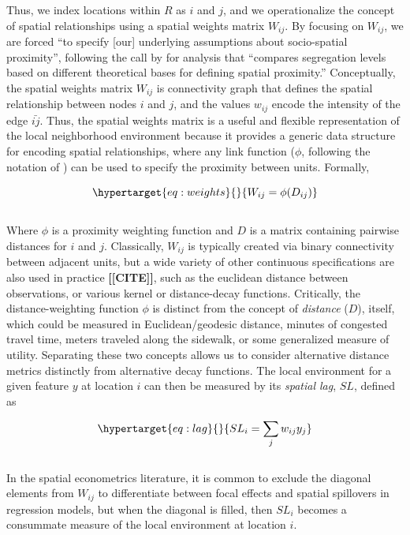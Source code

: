 \documentclass[
  10pt,
]{article}
\begin{document}
Thus, we index locations within \(R\) as \(i\) and \(j\), and we
operationalize the concept of spatial relationships using a spatial
weights matrix \(W_{ij}\). By focusing on \(W_{ij}\), we are forced ``to
specify {[}our{]} underlying assumptions about socio-spatial
proximity'', following the call by
\citet[p.154]{reardon2004MeasuresSpatial} for analysis that ``compares
segregation levels based on different theoretical bases for defining
spatial proximity.'' Conceptually, the spatial weights matrix \(W_{ij}\)
is connectivity graph that defines the spatial relationship between
nodes \(i\) and \(j\), and the values \(w_{ij}\) encode the intensity of
the edge \(\bar{ij}\). Thus, the spatial weights matrix is a useful and
flexible representation of the local neighborhood environment because it
provides a generic data structure for encoding spatial relationships,
where any link function (\(\phi\), following the notation of
\citet{reardon2004MeasuresSpatial}) can be used to specify the proximity
between units. Formally,

\begin{equation}\protect\hypertarget{eq:weights}{}{ W_{ij} = \phi(D_{ij}) }\label{eq:weights}\end{equation}\\
Where \(\phi\) is a proximity weighting function and \(D\) is a matrix
containing pairwise distances for \(i\) and \(j\). Classically,
\(W_{ij}\) is typically created via binary connectivity between adjacent
units, but a wide variety of other continuous specifications are also
used in practice \textbf{{[}{[}CITE{]}{]}}, such as the euclidean
distance between observations, or various kernel or distance-decay
functions. Critically, the distance-weighting function \(\phi\) is
distinct from the concept of \emph{distance} (\(D\)), itself, which
could be measured in Euclidean/geodesic distance, minutes of congested
travel time, meters traveled along the sidewalk, or some generalized
measure of utility. Separating these two concepts allows us to consider
alternative distance metrics distinctly from alternative decay
functions. The local environment for a given feature \(y\) at location
\(i\) can then be measured by its \emph{spatial lag}, \(SL\), defined as

\begin{equation}\protect\hypertarget{eq:lag}{}{ SL_i = \sum_j w_{ij} y_j }\label{eq:lag}\end{equation}\\
In the spatial econometrics literature, it is common to exclude the
diagonal elements from \(W_{ij}\) to differentiate between focal effects
and spatial spillovers in regression models, but when the diagonal is
filled, then \(SL_i\) becomes a consummate measure of the local
environment at location \(i\).
\end{document}
